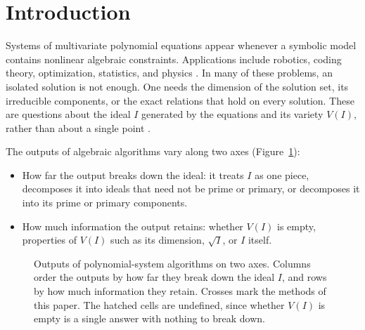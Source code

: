 \section{Introduction}
\label{sec:introduction}

Systems of multivariate polynomial equations appear whenever a
symbolic model contains nonlinear algebraic constraints.
Applications include robotics, coding theory, optimization,
statistics, and physics \cite{sturmfels2002solving}.
In many of these problems, an isolated solution is not enough.
One needs the dimension of the solution set, its irreducible
components, or the exact relations that hold on every solution.
These are questions about the ideal $I$ generated by the equations
and its variety $V(I)$, rather than about a single point
\cite{cox2015ideals,kreuzer2000computational}.

The outputs of algebraic algorithms vary along two axes
(Figure~\ref{fig:output_axes}):
\begin{itemize}
  \item How far the output breaks down the ideal: it treats $I$ as
    one piece, decomposes it into ideals that need not be prime or
    primary, or decomposes it into its prime or primary components.
  \item How much information the output retains: whether $V(I)$ is
    empty, properties of $V(I)$ such as its dimension, $\sqrt I$, or $I$ itself.
\end{itemize}

\begin{figure}[pos=htbp]
  \centering
  
  \caption{Outputs of polynomial-system algorithms on two axes. Columns
    order the outputs by how far they break down the ideal $I$, and rows by
    how much information they retain. Crosses mark the methods of this
    paper. The hatched cells are undefined, since whether $V(I)$ is
  empty is a single answer with nothing to break down.}
  \label{fig:output_axes}
\end{figure}

